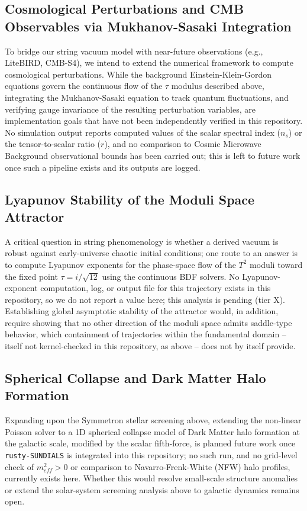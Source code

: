 \documentclass[11pt,a4paper]{article}
\begin{document}
\subsection{Cosmological Perturbations and CMB Observables via Mukhanov-Sasaki Integration}
To bridge our string vacuum model with near-future observations (e.g., LiteBIRD, CMB-S4), we intend to extend the numerical framework to compute cosmological perturbations. While the background Einstein-Klein-Gordon equations govern the continuous flow of the $\tau$ modulus described above, integrating the Mukhanov-Sasaki equation to track quantum fluctuations, and verifying gauge invariance of the resulting perturbation variables, are implementation goals that have not been independently verified in this repository. No simulation output reports computed values of the scalar spectral index ($n_s$) or the tensor-to-scalar ratio ($r$), and no comparison to Cosmic Microwave Background observational bounds has been carried out; this is left to future work once such a pipeline exists and its outputs are logged.

\subsection{Lyapunov Stability of the Moduli Space Attractor}
A critical question in string phenomenology is whether a derived vacuum is robust against early-universe chaotic initial conditions; one route to an answer is to compute Lyapunov exponents for the phase-space flow of the $T^2$ moduli toward the fixed point $\tau = i/\sqrt{12}$ using the continuous BDF solvers. No Lyapunov-exponent computation, log, or output file for this trajectory exists in this repository, so we do not report a value here; this analysis is pending (tier X). Establishing global asymptotic stability of the attractor would, in addition, require showing that no other direction of the moduli space admits saddle-type behavior, which containment of trajectories within the fundamental domain -- itself not kernel-checked in this repository, as above -- does not by itself provide.

\subsection{Spherical Collapse and Dark Matter Halo Formation}
Expanding upon the Symmetron stellar screening above, extending the non-linear Poisson solver to a 1D spherical collapse model of Dark Matter halo formation at the galactic scale, modified by the scalar fifth-force, is planned future work once \texttt{rusty-SUNDIALS} is integrated into this repository; no such run, and no grid-level check of $m^2_{eff} > 0$ or comparison to Navarro-Frenk-White (NFW) halo profiles, currently exists here. Whether this would resolve small-scale structure anomalies or extend the solar-system screening analysis above to galactic dynamics remains open.
\end{document}
